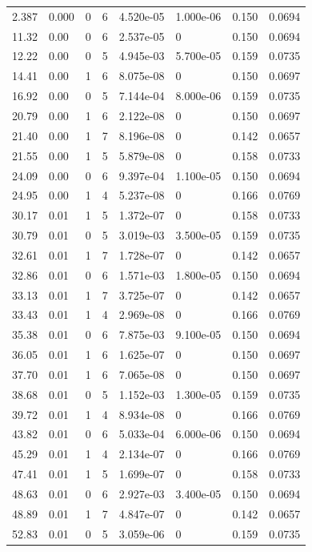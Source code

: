 \documentclass[preview]{standalone}
\begin{document}
{{\begin{tabular}{L{1.2cm}C{1.2cm} C{0.3cm}C{0.5cm} C{1.4cm}C{1.4cm} C{1.4cm}C{1.4cm}}
  2.387  &  0.000  & 0     &  6 &  4.520e-05  & 1.000e-06  & 0.150 &  0.0694   \\ 
  11.32  &  0.00  & 0     &  6 &  2.537e-05  & 0  & 0.150 &  0.0694   \\ 
  12.22  &  0.00  & 0     &  5 &  4.945e-03  & 5.700e-05  & 0.159 &  0.0735   \\ 
  14.41  &  0.00  & 1     &  6 &  8.075e-08  & 0  & 0.150 &  0.0697   \\ 
  16.92  &  0.00  & 0     &  5 &  7.144e-04  & 8.000e-06  & 0.159 &  0.0735   \\ 
  20.79  &  0.00  & 1     &  6 &  2.122e-08  & 0  & 0.150 &  0.0697   \\ 
  21.40  &  0.00  & 1     &  7 &  8.196e-08  & 0  & 0.142 &  0.0657   \\ 
  21.55  &  0.00  & 1     &  5 &  5.879e-08  & 0  & 0.158 &  0.0733   \\ 
  24.09  &  0.00  & 0     &  6 &  9.397e-04  & 1.100e-05  & 0.150 &  0.0694   \\ 
  24.95  &  0.00  & 1     &  4 &  5.237e-08  & 0  & 0.166 &  0.0769   \\ 
  30.17  &  0.01  & 1     &  5 &  1.372e-07  & 0  & 0.158 &  0.0733   \\ 
  30.79  &  0.01  & 0     &  5 &  3.019e-03  & 3.500e-05  & 0.159 &  0.0735   \\ 
  32.61  &  0.01  & 1     &  7 &  1.728e-07  & 0  & 0.142 &  0.0657   \\ 
  32.86  &  0.01  & 0     &  6 &  1.571e-03  & 1.800e-05  & 0.150 &  0.0694   \\ 
  33.13  &  0.01  & 1     &  7 &  3.725e-07  & 0  & 0.142 &  0.0657   \\ 
  33.43  &  0.01  & 1     &  4 &  2.969e-08  & 0  & 0.166 &  0.0769   \\ 
  35.38  &  0.01  & 0     &  6 &  7.875e-03  & 9.100e-05  & 0.150 &  0.0694   \\ 
  36.05  &  0.01  & 1     &  6 &  1.625e-07  & 0  & 0.150 &  0.0697   \\ 
  37.70  &  0.01  & 1     &  6 &  7.065e-08  & 0  & 0.150 &  0.0697   \\ 
  38.68  &  0.01  & 0     &  5 &  1.152e-03  & 1.300e-05  & 0.159 &  0.0735   \\ 
  39.72  &  0.01  & 1     &  4 &  8.934e-08  & 0  & 0.166 &  0.0769   \\ 
  43.82  &  0.01  & 0     &  6 &  5.033e-04  & 6.000e-06  & 0.150 &  0.0694   \\ 
  45.29  &  0.01  & 1     &  4 &  2.134e-07  & 0  & 0.166 &  0.0769   \\ 
  47.41  &  0.01  & 1     &  5 &  1.699e-07  & 0  & 0.158 &  0.0733   \\ 
  48.63  &  0.01  & 0     &  6 &  2.927e-03  & 3.400e-05  & 0.150 &  0.0694   \\ 
  48.89  &  0.01  & 1     &  7 &  4.847e-07  & 0  & 0.142 &  0.0657   \\ 
  52.83  &  0.01  & 0     &  5 &  3.059e-06  & 0  & 0.159 &  0.0735   \\ 
\hline 
\end{tabular} 

}}
\end{document}
